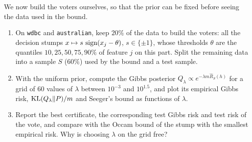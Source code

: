\documentclass[11pt]{article}
\newcommand{\code}[1]{\texttt{#1}}
\begin{document}
We now build the voters ourselves, so that the prior can be fixed before seeing the data used in the bound.
\begin{enumerate}
\item On \code{wdbc} and \code{australian}, keep $20\%$ of the data to build the voters: all the decision stumps
      $x\mapsto s\,\operatorname{sign}(x_j-\theta)$, $s\in\{\pm1\}$, whose thresholds $\theta$ are the quantiles $10,25,50,75,90\%$ of
      feature $j$ on this part. Split the remaining data into a sample $S$ ($60\%$) used by the bound and a test sample.
\item With the uniform prior, compute the Gibbs posterior $Q_\lambda\propto e^{-\lambda m\widehat R_S(h)}$ for a grid of
      $60$ values of $\lambda$ between $10^{-3}$ and $10^{1.5}$, and plot its empirical Gibbs risk, $\operatorname{KL}(Q_\lambda\|P)/m$ and
      Seeger's bound as functions of $\lambda$.
\item Report the best certificate, the corresponding test Gibbs risk and test risk of the vote, and compare with
      the Occam bound of the stump with the smallest empirical risk. Why is choosing $\lambda$ on the grid free?
\end{enumerate}
\end{document}
